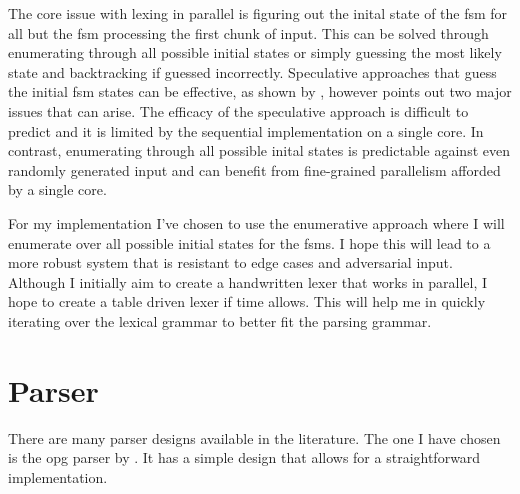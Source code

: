 The core issue with lexing in parallel is figuring out the inital state
of the \gls{fsm} for all but the \gls{fsm} processing the first chunk of
input. This can be solved through enumerating through all possible initial
states or simply guessing the most likely state and backtracking if guessed
incorrectly. Speculative approaches that guess the initial \gls{fsm} states
can be effective, as shown by \cite{luchaup_speculative_2011}, however
\cite{mytkowicz_data-parallel_2014} points out two major issues that can
arise. The efficacy of the speculative approach is difficult to predict and
it is limited by the sequential implementation on a single core. In contrast,
enumerating through all possible inital states is predictable against even
randomly generated input and can benefit from fine-grained parallelism afforded
by a single core.

For my implementation I've chosen to use the enumerative approach where I will
enumerate over all possible initial states for the \glspl{fsm}. I hope this will
lead to a more robust system that is resistant to edge cases and adversarial
input. Although I initially aim to create a handwritten lexer that works in
parallel, I hope to create a table driven lexer if time allows. This will help
me in quickly iterating over the lexical grammar to better fit the parsing
grammar.

\section{Parser} \label{parser}

There are many parser designs available in the literature. The one I have chosen
is the \gls{opg} parser by \cite{barenghi_parallel_2015}. It has a simple design
that allows for a straightforward implementation. 

